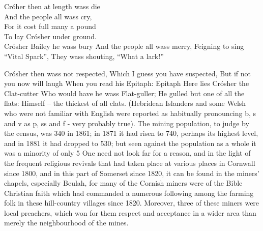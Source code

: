 \documentclass[11pt]{book}
\begin{document}
Cróher then at length wass die \\
And the people all wass cry, \\
For it cost full many a pound \\
To lay Crósher under ground. \\

Crósher Bailey he wass bury
And the people all wass merry,
Feigning to sing “Vital Spark”, 
They wass shouting, “What a lark!”

Crósher then wass not respected,
Which I guess you have suspected,
But if not you now will laugh
When you read his Epitaph:	   	      	
Epitaph
Here lies Crósher the Clat-cutter
Who would have he wass Flat-guller;
He gulled but one of all the flats:
Himself --  the thickest of all clats.	
             (Hebridean Islanders and some Welsh who were not familiar with English were reported as habitually pronouncing  b, s and v as p, ss  and f  - very probably true).	  	
  The mining population, to judge by the census, was 340 in 1861; in 1871 it had risen to 740, perhaps its highest level, and in 1881 it had dropped to 530; but seen against the population as a whole it was a minority of only 5%
     One need not look far for a reason, and in the light of the frequent religious revivals that had taken place at various places in Cornwall since 1800, and in this part of Somerset since 1820, it can be found in the miners’ chapels, especially Beulah, for many of the Cornish miners were of the Bible Christian faith which had commanded a numerous following among the farming folk in these hill-country villages since 1820. Moreover, three of these miners were local preachers, which won for them respect and acceptance in a wider area than merely the neighbourhood of the mines.  
\end{document}
